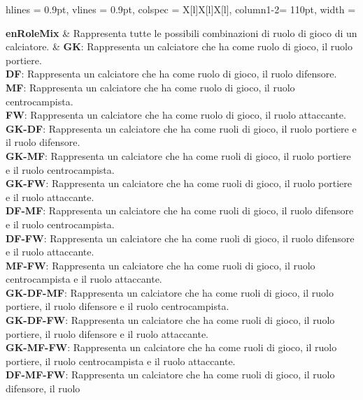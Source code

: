 \begin{tblr}{
	hlines = {0.9pt}, vlines = {0.9pt}, colspec = {X[l]X[l]X[l]}, column{1-2}= {110pt},
    width = \textwidth
}

	{
		\textbf{enRoleMix}
	}
	&
	{
		Rappresenta tutte le possibili combinazioni di ruolo di gioco
		di un calciatore.
	}
	&
	{
		\textbf{GK}: Rappresenta un calciatore che ha
			come ruolo di gioco, il ruolo portiere.\\
		\medskip\textbf{DF}: Rappresenta un calciatore che ha
			come ruolo di gioco, il ruolo difensore.\\
		\medskip\textbf{MF}: Rappresenta un calciatore che ha
			come ruolo di gioco, il ruolo centrocampista.\\
		\medskip\textbf{FW}: Rappresenta un calciatore che ha
			come ruolo di gioco, il ruolo attaccante.\\
		\medskip\textbf{GK-DF}: Rappresenta un calciatore che ha
			come ruoli di gioco, il ruolo portiere e il ruolo difensore.\\
		\medskip\textbf{GK-MF}: Rappresenta un calciatore che ha
			come ruoli di gioco, il ruolo portiere e
			il ruolo centrocampista.\\
		\medskip\textbf{GK-FW}: Rappresenta un calciatore che ha
			come ruoli di gioco, il ruolo portiere e il ruolo attaccante.\\
		\medskip\textbf{DF-MF}: Rappresenta un calciatore che ha
			come ruoli di gioco, il ruolo difensore
			e il ruolo centrocampista.\\
		\medskip\textbf{DF-FW}: Rappresenta un calciatore che ha
			come ruoli di gioco, il ruolo difensore
			e il ruolo attaccante.\\
		\medskip\textbf{MF-FW}: Rappresenta un calciatore che ha
			come ruoli di gioco, il ruolo centrocampista
			e il ruolo attaccante.\\
		\medskip\textbf{GK-DF-MF}: Rappresenta un calciatore che ha
			come ruoli di gioco, il ruolo portiere, il ruolo difensore
			e il ruolo centrocampista.\\
		\medskip\textbf{GK-DF-FW}: Rappresenta un calciatore che ha
			come ruoli di gioco, il ruolo portiere, il ruolo difensore
			e il ruolo attaccante.\\
		\medskip\textbf{GK-MF-FW}: Rappresenta un calciatore che ha
			come ruoli di gioco, il ruolo portiere, il ruolo centrocampista
			e il ruolo attaccante.\\
		\medskip\textbf{DF-MF-FW}: Rappresenta un calciatore che ha
			come ruoli di gioco, il ruolo difensore, il ruolo
}
\end{tblr}

